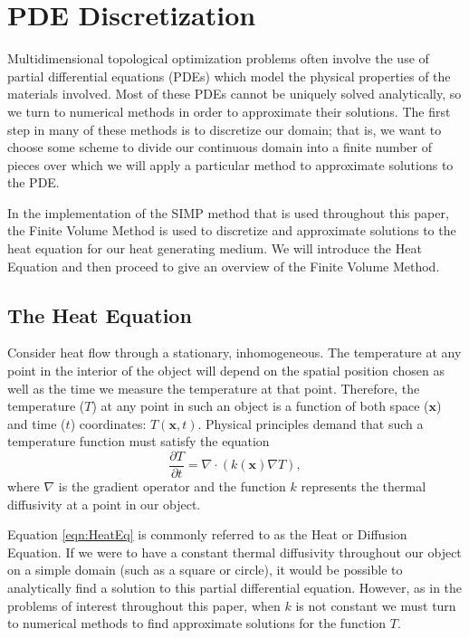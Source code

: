 \section{PDE Discretization}
Multidimensional topological optimization problems often involve the use of partial differential equations (PDEs) which model the physical properties of the materials involved. Most of these PDEs cannot be uniquely solved analytically, so we turn to numerical methods in order to approximate their solutions. The first step in many of these methods is to discretize our domain; that is, we want to choose some scheme to divide our continuous domain into a finite number of pieces over which we will apply a particular method to approximate solutions to the PDE.

In the implementation of the SIMP method that is used throughout this paper, the Finite Volume Method is used to discretize and approximate solutions to the heat equation for our heat generating medium. We will introduce the Heat Equation and then proceed to give an overview of the Finite Volume Method.
\subsection{The Heat Equation}
Consider heat flow through a stationary, inhomogeneous. The temperature at any point in the interior of the object will depend on the spatial position chosen as well as the time we measure the temperature at that point. Therefore, the temperature ($T$) at any point in such an object is a function of both space ($\mathbf{x}$) and time ($t$) coordinates: $T(\mathbf{x},t)$.
Physical principles demand that such a temperature function must satisfy the equation
\begin{equation}
	\frac{\partial T}{\partial t}=\nabla\cdot\left(k(\mathbf{x})\nabla T\right)\label{eqn:HeatEq},
\end{equation}
where $\nabla$ is the gradient operator and the function $k$ represents the thermal diffusivity at a point in our object.

Equation \eqref{eqn:HeatEq} is commonly referred to as the Heat or Diffusion Equation. If we were to have a constant thermal diffusivity throughout our object on a simple domain (such as a square or circle), it would be possible to analytically find a solution to this partial differential equation. However, as in the problems of interest throughout this paper, when $k$ is not constant we must turn to numerical methods to find approximate solutions for the function $T$.

